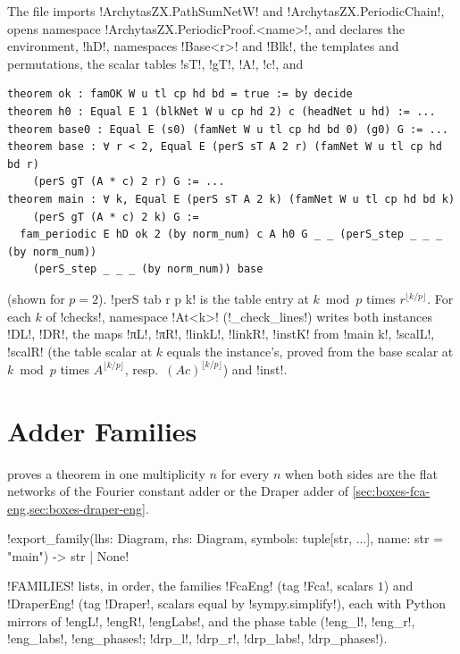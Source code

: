 {{{The file imports \lexlean!ArchytasZX.PathSumNetW! and \lexlean!ArchytasZX.PeriodicChain!, opens
namespace \lexlean!ArchytasZX.PeriodicProof.<name>!, and declares the environment, \lexlean!hD!,
namespaces \lexlean!Base<r>! and \lexlean!Blk!, the templates and permutations, the scalar tables
\lexlean!sT!, \lexlean!gT!, \lexlean!A!, \lexlean!c!, and
\begin{lstlisting}[style=lexlean]
theorem ok : famOK W u tl cp hd bd = true := by decide
theorem h0 : Equal E 1 (blkNet W u cp hd 2) c (headNet u hd) := ...
theorem base0 : Equal E (s0) (famNet W u tl cp hd bd 0) (g0) G := ...
theorem base : ∀ r < 2, Equal E (perS sT A 2 r) (famNet W u tl cp hd bd r)
    (perS gT (A * c) 2 r) G := ...
theorem main : ∀ k, Equal E (perS sT A 2 k) (famNet W u tl cp hd bd k)
    (perS gT (A * c) 2 k) G :=
  fam_periodic E hD ok 2 (by norm_num) c A h0 G _ _ (perS_step _ _ _ (by norm_num))
    (perS_step _ _ _ (by norm_num)) base
\end{lstlisting}
(shown for $p=2$). \lexlean!perS tab r p k! is the table entry at $k \bmod p$ times $r^{\lfloor
k/p\rfloor}$. For each $k$ of \lexcode!checks!, namespace \lexlean!At<k>! (\lexpy!_check_lines!) writes both
instances \lexlean!DL!, \lexlean!DR!, the maps \lexlean!πL!, \lexlean!πR!, \lexlean!linkL!, \lexlean!linkR!,
\lexlean!instK! from \lexlean!main k!, \lexlean!scalL!, \lexlean!scalR! (the table scalar at $k$ equals the
instance's, proved from the base scalar at $k \bmod p$ times $A^{\lfloor k/p\rfloor}$, resp.\
$(Ac)^{\lfloor k/p\rfloor}$) and \lexlean!inst!.

\section{Adder Families}\label{sec:lean-export-adder}

 proves a theorem in one multiplicity $n$ for every $n$ when both sides are the flat networks of the Fourier constant adder or the Draper adder of \cref{sec:boxes-fca-eng,sec:boxes-draper-eng}.

\begin{signature}
\py!export_family(lhs: Diagram, rhs: Diagram, symbols: tuple[str, ...], name: str = "main") -> str | None!
\end{signature}

\py!FAMILIES! lists, in order, the families \code!FcaEng! (tag \code!Fca!, scalars $1$) and \code!DraperEng! (tag \code!Draper!, scalars equal by \py!sympy.simplify!), each with Python mirrors of \lean!engL!, \lean!engR!, \lean!engLabs!, and the phase table (\py!eng_l!, \py!eng_r!, \py!eng_labs!, \py!eng_phases!; \py!drp_l!, \py!drp_r!, \py!drp_labs!, \py!drp_phases!).

}}}
